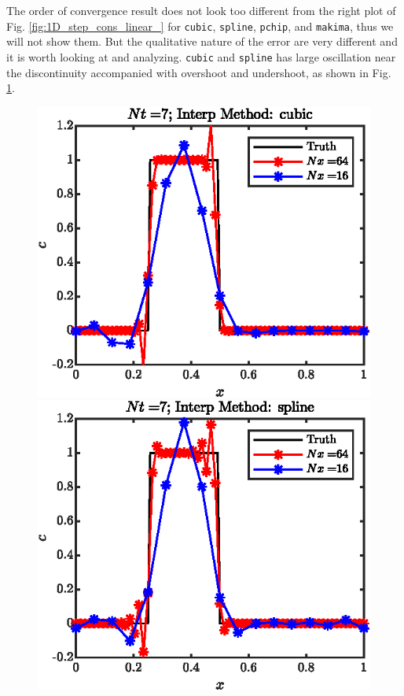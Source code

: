 \documentclass[11pt,letterpaper]{article}
\begin{document}
The order of convergence result does not look too different from the right plot of Fig. \ref{fig:1D_step_cons_linear_} for \texttt{cubic}, \texttt{spline}, \texttt{pchip}, and \texttt{makima}, thus we will not show them. But the qualitative nature of the error are very different and it is worth looking at and analyzing. \texttt{cubic} and \texttt{spline} has large oscillation near the discontinuity accompanied with overshoot and undershoot, as shown in Fig. \ref{fig:1D_step_cons_cubic_sol}.
\begin{figure}[H]
    \centering
    \includegraphics{figs/1D_step_cons_cubic_sol}
    \includegraphics{figs/1D_step_cons_spline_sol}
    \caption{}\label{fig:1D_step_cons_cubic_sol}
\end{figure}
\end{document}
